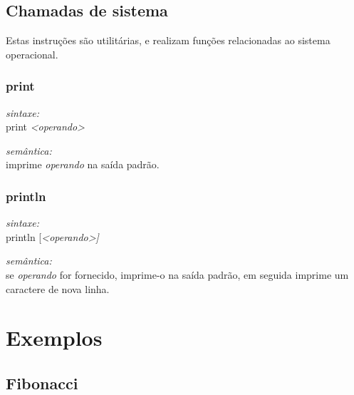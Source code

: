 \documentclass[12pt,a4paper,extrafontsizes,article]{memoir}
\newcommand*{\srcfont}{\fontfamily{pcr}\selectfont}
\begin{document}
\section{Chamadas de sistema}

Estas instruções são utilitárias, e realizam funções relacionadas ao sistema operacional.

\subsection{\textbf{print}}

\textit{sintaxe:}\\{\srcfont print \textit{<operando>}}

\noindent \textit{semântica:}\\imprime \textit{operando} na saída padrão.


\subsection{\textbf{println}}

\textit{sintaxe:}\\{\srcfont println [\textit{<operando>]}}

\noindent \textit{semântica:}\\se \textit{operando} for fornecido, imprime-o na saída padrão, em seguida imprime um
caractere de nova linha.


\clearpage
\chapter{Exemplos}

\section{Fibonacci}
\end{document}
